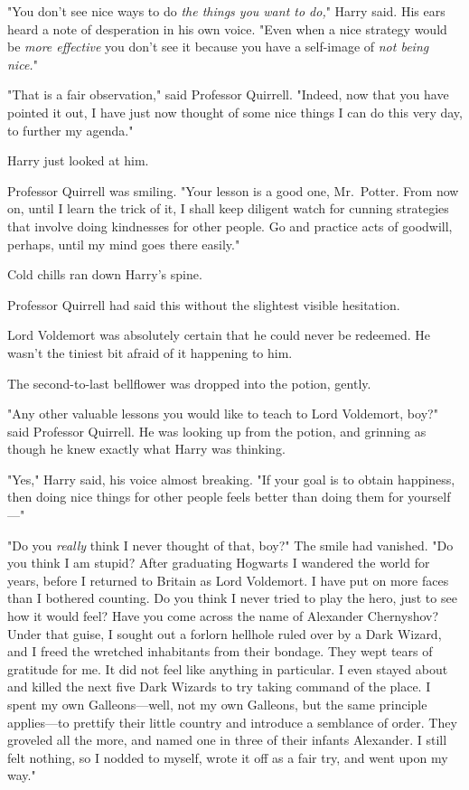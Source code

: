 "You don't see nice ways to do \emph{the things you want to do,}" Harry said.
His ears heard a note of desperation in his own voice. "Even when a nice
strategy would be \emph{more effective} you don't see it because you have a
self-image of \emph{not being nice.}"

"That is a fair observation," said Professor Quirrell. "Indeed, now that you
have pointed it out, I have just now thought of some nice things I can do this
very day, to further my agenda."

Harry just looked at him.

Professor Quirrell was smiling. "Your lesson is a good one, Mr.~Potter. From
now on, until I learn the trick of it, I shall keep diligent watch for cunning
strategies that involve doing kindnesses for other people. Go and practice acts
of goodwill, perhaps, until my mind goes there easily."

Cold chills ran down Harry's spine.

Professor Quirrell had said this without the slightest visible hesitation.

Lord Voldemort was absolutely certain that he could never be redeemed. He
wasn't the tiniest bit afraid of it happening to him.

The second-to-last bellflower was dropped into the potion, gently.

"Any other valuable lessons you would like to teach to Lord Voldemort, boy?"
said Professor Quirrell. He was looking up from the potion, and grinning as
though he knew exactly what Harry was thinking.

"Yes," Harry said, his voice almost breaking. "If your goal is to obtain
happiness, then doing nice things for other people feels better than doing them
for yourself---"

"Do you \emph{really} think I never thought of that, boy?" The smile had
vanished. "Do you think I am stupid? After graduating Hogwarts I wandered the
world for years, before I returned to Britain as Lord Voldemort. I have put on
more faces than I bothered counting. Do you think I never tried to play the
hero, just to see how it would feel? Have you come across the name of Alexander
Chernyshov? Under that guise, I sought out a forlorn hellhole ruled over by a
Dark Wizard, and I freed the wretched inhabitants from their bondage. They wept
tears of gratitude for me. It did not feel like anything in particular. I even
stayed about and killed the next five Dark Wizards to try taking command of the
place. I spent my own Galleons---well, not my own Galleons, but the same
principle applies---to prettify their little country and introduce a semblance
of order. They groveled all the more, and named one in three of their infants
Alexander. I still felt nothing, so I nodded to myself, wrote it off as a fair
try, and went upon my way."

